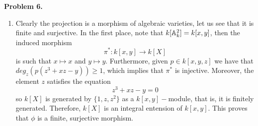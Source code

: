 \documentclass{article}
\begin{document}
\vspace{5mm}
\noindent\textbf{Problem 6.}
\begin{enumerate}
    \item[(a)] Clearly the projection is a morphism of algebraic varieties, let us see that it is
    finite and surjective. In the first place, note that $k[\mathbb{A}_{k}^{2}]=k[x,y]$, then the induced
    morphism
    \begin{equation*}
        \pi^{*}:k[x,y]\to k[X]
    \end{equation*}
    is such that $x\mapsto x$ and $y\mapsto y$. Furthermore, given $p\in k[x,y,z]$ we have that
    $deg_{z}(p(z^{3}+xz-y))\geq1$, which implies that $\pi^{*}$ is injective. Moreover, the 
    element $z$ satisfies the equation
    \begin{equation*}
        z^{3}+xz-y=0
    \end{equation*}
    so $k[X]$ is generated by $\{1,z,z^{2}\}$ as a $k[x,y]-$module, that is, it is finitely 
    generated. Therefore, $k[X]$ is an integral entension of $k[x,y]$. This proves that $\phi$ is
    a finite, surjective morphism.


\end{enumerate}
\end{document}
